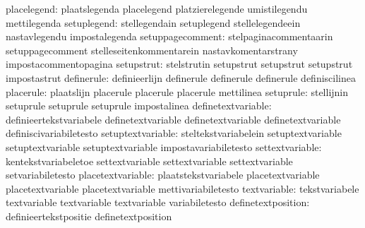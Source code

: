                      placelegend: plaatslegenda                    placelegend
                                  platzierelegende                 umistilegendu
                                  mettilegenda
                     setuplegend: stellegendain                    setuplegend
                                  stellelegendeein                 nastavlegendu
                                  impostalegenda
                setuppagecomment: stelpaginacommentaarin           setuppagecomment
                                  stelleseitenkommentarein         nastavkomentarstrany
                                  impostacommentopagina
                      setupstrut: stelstrutin                      setupstrut
                                  setupstrut                       setupstrut
                                  impostastrut
                      definerule: definieerlijn                    definerule
                                  definerule                       definerule
                                  definiscilinea
                       placerule: plaatslijn                       placerule
                                  placerule                        placerule
                                  mettilinea
                       setuprule: stellijnin                       setuprule
                                  setuprule                        setuprule
                                  impostalinea
              definetextvariable: definieertekstvariabele          definetextvariable
                                  definetextvariable               definetextvariable
                                  definiscivariabiletesto
               setuptextvariable: steltekstvariabelein             setuptextvariable
                                  setuptextvariable                setuptextvariable
                                  impostavariabiletesto
                 settextvariable: kentekstvariabeletoe             settextvariable
                                  settextvariable                  settextvariable
                                  setvariabiletesto                %
               placetextvariable: plaatstekstvariabele             placetextvariable
                                  placetextvariable                placetextvariable
                                  mettivariabiletesto
                    textvariable: tekstvariabele                   textvariable
                                  textvariable                     textvariable
                                  variabiletesto
              definetextposition: definieertekstpositie            definetextposition
